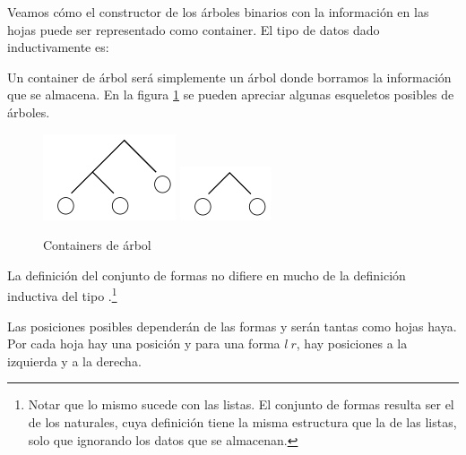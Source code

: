 \begin{example} \label{code:tree} Veamos cómo el constructor de los árboles binarios con la información en las hojas puede ser representado como container. El tipo de datos dado inductivamente es:
  

Un container de árbol será simplemente un árbol donde borramos la información que se almacena.
En la figura \ref{fig:Tree} se pueden apreciar algunas esqueletos posibles de árboles. 

\begin{figure}[H]
\begin{center}
  \includegraphics{img/tree1.pdf}\qquad\qquad
  \quad\qquad
  \includegraphics{img/tree2.pdf}
\end{center}
\caption{Containers de árbol}
\label{fig:Tree}
\end{figure}

La definición del conjunto de formas no difiere en mucho de la definición
inductiva del tipo .\footnote{Notar
  que lo mismo sucede con las listas. El conjunto de formas resulta
  ser el de los naturales, cuya definición tiene la misma estructura
  que la de las listas, solo que ignorando los datos que se almacenan.} 


Las posiciones posibles dependerán de las formas y serán tantas como
hojas haya. Por cada hoja hay una posición y para una forma  $l\ r$, hay posiciones a la izquierda y a la derecha. 



\end{example}
